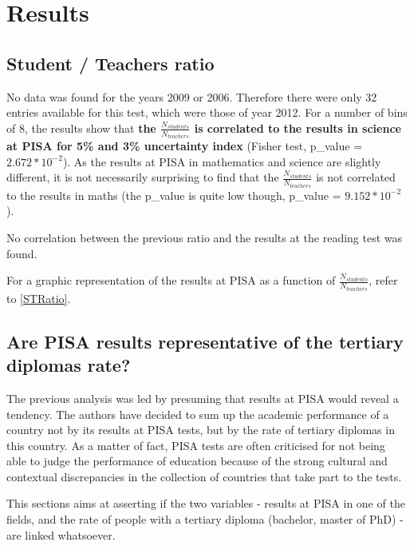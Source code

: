 \documentclass[12pt,a4paper]{article}
\begin{document}
\section{Results}

\subsection{Student / Teachers ratio}

No data was found for the years 2009 or 2006. Therefore there were only 32 entries available for this test, which were those of year 2012.
For a number of bins of 8, the results show that \textbf{the $\frac{N_{students}}{N_{teachers}}$ is correlated to the results in science at PISA for 5\% and 3\% uncertainty index} (Fisher test, p\_value = $2.672*10^{-2}$). As the results at PISA in mathematics and science are slightly different, it is not necessarily surprising to find that the $\frac{N_{students}}{N_{teachers}}$ is not correlated to the results in maths (the p\_value is quite low though, p\_value = $9.152*10^{-2}$).

No correlation between the previous ratio and the results at the reading test was found.

For a graphic representation of the results at PISA as a function of $\frac{N_{students}}{N_{teachers}}$, refer to \ref{STRatio}.

\subsection{Are PISA results representative of the tertiary diplomas rate? }

The previous analysis was led by presuming that results at PISA would reveal a tendency. The authors have decided to sum up the academic performance of a country not by its results at PISA tests, but by the rate of tertiary diplomas in this country. As a matter of fact, PISA tests are often criticised for not being able to judge the performance of education because of the strong cultural and contextual discrepancies in the collection of countries that take part to the tests.

This sections aims at asserting if the two variables - results at PISA in one of the fields, and the rate of people with a tertiary diploma (bachelor, master of PhD) - are linked whatsoever.
\end{document}
